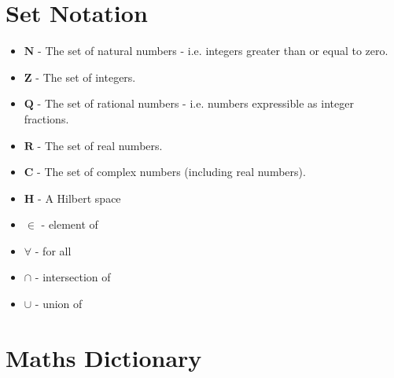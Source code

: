 \section{Set Notation}
		
		\begin{itemize}
			\item $\mathbf{N}$ - The set of natural numbers - i.e. integers greater than or equal to zero.
			\item $\mathbf{Z}$ - The set of integers.
			\item $\mathbf{Q}$ - The set of rational numbers - i.e. numbers expressible as integer fractions.
			\item $\mathbf{R}$ - The set of real numbers.
			\item $\mathbf{C}$ - The set of complex numbers (including real numbers).
			\item $\mathbf{H}$ - A Hilbert space
			\item $\in$ - element of
			\item $\forall$ - for all
			\item $\cap$ - intersection of
			\item $\cup$ - union of
		\end{itemize}
		
	\section{Maths Dictionary}
	

